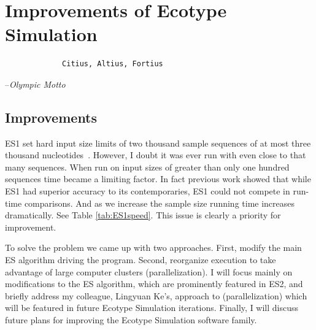 \chapter{Improvements of Ecotype Simulation}


\begin{shadequote}
\begin{center}
    \Large\begin{verbatim} 
             Citius, Altius, Fortius
 \end{verbatim}  
\end{center}
\par--\emph{Olympic Motto}
\end{shadequote}


\section{Improvements}
ES1 set hard input size limits of two thousand sample sequences of at most three thousand nucleotides~\cite{koeppel2008identifying}.
However, I doubt it was ever run with even close to that many sequences.
When run on input sizes of greater than only one hundred sequences time became a limiting factor.
In fact previous work showed that while ES1 had superior  accuracy to its contemporaries, ES1 could not compete in run-time comparisons.
And as we increase the sample size running time increases dramatically.
See Table \ref{tab:ES1speed}.
This issue is clearly a priority for improvement.

To solve the problem we came up with two approaches.
First, modify the main ES algorithm driving the program.
Second, reorganize execution to take advantage of large computer clusters (parallelization).
I will focus mainly on modifications to the ES algorithm, which are prominently featured in ES2, and briefly address my colleague, Lingyuan Ke's, approach to (parallelization) which will be featured in future Ecotype Simulation iterations.
Finally, I will discuss future plans for improving the Ecotype Simulation software family.


